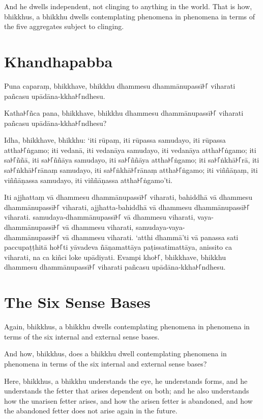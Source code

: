 And he dwells independent, not clinging to anything in the world. That is how,
bhikkhus, a bhikkhu dwells contemplating phenomena in phenomena in terms of the
five aggregates subject to clinging.


\paliPage
\section*{Khandhapabba}

Puna caparaṃ, bhikkhave, bhikkhu dhammesu dhammānupassī꜔꜒ viharati pañcasu
upādāna-kkha꜔꜒ndhesu.

Katha꜔꜒ñca pana, bhikkhave, bhikkhu dhammesu dhammānupassī꜔꜒ viharati pañcasu
upādāna-kkha꜔꜒ndhesu?

Idha, bhikkhave, bhikkhu:
‘iti rūpaṃ, iti rūpassa samudayo, iti rūpassa attha꜔꜒ṅgamo;
iti vedanā, iti vedanāya samudayo, iti vedanāya attha꜔꜒ṅgamo;
iti sa꜔꜒ññā, iti sa꜔꜒ññāya samudayo, iti sa꜔꜒ññāya attha꜔꜒ṅgamo;
iti sa꜔꜒ṅkhā꜔꜒rā, iti sa꜔꜒ṅkhā꜔꜒rānaṃ samudayo, iti sa꜔꜒ṅkhā꜔꜒rānaṃ attha꜔꜒ṅgamo;
iti viññāṇaṃ, iti viññāṇassa samudayo, iti viññāṇassa attha꜔꜒ṅgamo’ti.

Iti ajjhattaṃ vā dhammesu dhammānupassī꜔꜒ viharati,
bahiddhā vā dhammesu dhammānupassī꜔꜒ viharati,
ajjhatta-bahiddhā vā dhammesu dhammānupassī꜔꜒ viharati.
samudaya-dhammānupassī꜔꜒ vā dhammesu viharati,
vaya-dhammānupassī꜔꜒ vā dhammesu viharati,
samudaya-vaya-\\ dhammānupassī꜔꜒ vā dhammesu viharati.
‘atthi dhammā’ti vā panassa sati paccupaṭṭhitā ho꜔꜒ti
yāvadeva ñāṇamattāya paṭissatimattāya, anissito ca viharati,
na ca kiñci loke upādiyati. Evampi kho꜔꜒, bhikkhave, bhikkhu
dhammesu dhammānupassī꜔꜒ viharati pañcasu upādāna-kkha꜔꜒ndhesu.


\englishPage
\section{The Six Sense Bases}

Again, bhikkhus, a bhikkhu dwells contemplating phenomena in phenomena in terms
of the six internal and external sense bases.

And how, bhikkhus, does a bhikkhu dwell contemplating phenomena in phenomena in
terms of the six internal and external sense bases?

Here, bhikkhus, a bhikkhu understands the eye, he understands forms, and he
understands the fetter that arises dependent on both; and he also understands
how the unarisen fetter arises, and how the arisen fetter is abandoned, and how
the abandoned fetter does not arise again in the future.

